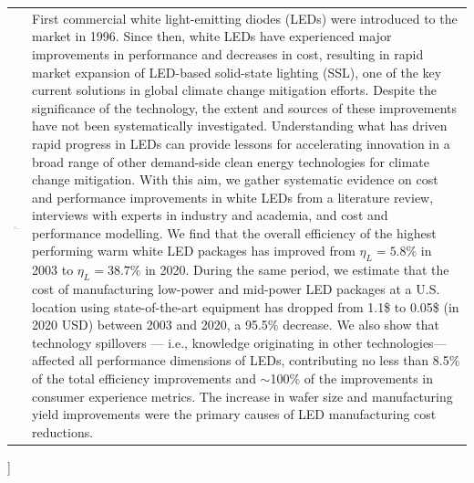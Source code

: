 \documentclass[twoside,twocolumn,9pt]{article}
\begin{document}
\begin{@twocolumnfalse}
\begin{tabular}{m{4.5cm} p{13.5cm} }
\includegraphics{auxiliary/rsc_template_head_foot/dates} & \noindent\normalsize{First commercial white light-emitting diodes (LEDs) were introduced to the market in 1996. Since then, white LEDs have experienced major improvements in performance and decreases in cost, resulting in rapid market expansion of LED-based solid-state lighting (SSL), one of the key current solutions in global climate change mitigation efforts. Despite the significance of the technology, the extent and sources of these improvements have not been systematically investigated. Understanding what has driven rapid progress in LEDs can provide lessons for accelerating innovation in a broad range of other demand-side clean energy technologies for climate change mitigation. With this aim, we gather systematic evidence on cost and performance improvements in white LEDs from a literature review, interviews with experts in industry and academia, and cost and performance modelling. We find that the overall efficiency of the highest performing warm white LED packages has improved from $\eta_L=5.8\%$ in 2003 to $\eta_L=38.7\%$ in 2020. During the same period, we estimate that the cost of manufacturing low-power and mid-power LED packages at a U.S. location using state-of-the-art equipment has dropped from 1.1\$ to 0.05\$ (in 2020 USD) between 2003 and 2020, a 95.5\% decrease. We also show that technology spillovers — i.e., knowledge originating in other technologies—affected all performance dimensions of LEDs, contributing no less than 8.5\% of the total efficiency improvements and $\sim$100\% of the improvements in consumer experience metrics. The increase in wafer size and manufacturing yield improvements were the primary causes of LED manufacturing cost reductions.}

\end{tabular}

 \end{@twocolumnfalse} \vspace{0.6cm}

  ]

\renewcommand*\rmdefault{bch}\normalfont\upshape
\rmfamily
\end{document}
